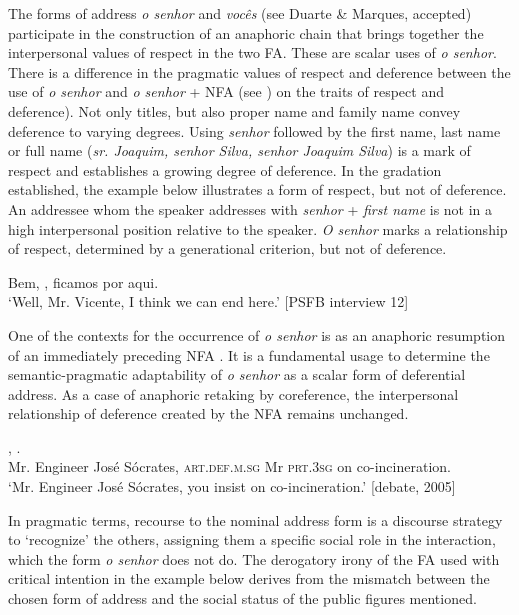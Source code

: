 \documentclass[output=paper]{langscibook}
\begin{document}
The forms of address \textit{o senhor} and \textit{vocês} (see Duarte \& Marques, accepted) participate in the construction of an anaphoric chain that brings together the interpersonal values of respect in the two FA. These are scalar uses of \textit{o senhor}. There is a difference in the pragmatic values of respect and deference between the use of \textit{o senhor} and \textit{o senhor} + NFA (see \citealt{HummelLopes2020}) on the traits of respect and deference).  Not only titles, but also proper name and family name convey deference to varying degrees. Using \textit{senhor} followed by the first name, last name or full name (\textit{sr. Joaquim, senhor Silva, senhor Joaquim Silva}) is a mark of respect and establishes a growing degree of deference. In the gradation established, the example below  illustrates a form of respect, but not of deference. An addressee whom the speaker addresses with \textit{senhor} + \textit{first name} is not in a high interpersonal position relative to the speaker. \textit{O senhor} marks a relationship of respect, determined by a generational criterion, but not of deference.


\ea\label{ex:marques:27}
Bem, , ficamos por aqui.\\
\glt ‘Well, Mr. Vicente, I think we can end here.’ [PSFB interview 12]\\
\z


One of the contexts for the occurrence of \textit{o senhor} is as an anaphoric resumption of an immediately preceding NFA . It is a fundamental usage to determine the semantic-pragmatic adaptability of \textit{o senhor} as a scalar form of deferential address. As a case of anaphoric retaking by coreference, the interpersonal relationship of deference created by the NFA remains unchanged.

\ea\label{ex:marques:28}
\gll {}    ,                          .\\
         Mr. Engineer      José Sócrates, \textsc{art.def.m.sg} Mr      \textsc{prt.3sg}  on co-incineration.\\
\glt ‘Mr. Engineer José Sócrates, you insist on co-incineration.’ [debate, 2005]
\z 



In pragmatic terms, recourse to the nominal address form is a discourse strategy to ‘recognize’ the others, assigning them a specific social role in the interaction, which the form \textit{o senhor} does not do. The derogatory irony of the FA used with critical intention in the example below  derives from the mismatch between the chosen form of address and the social status of the public figures mentioned.
\end{document}
